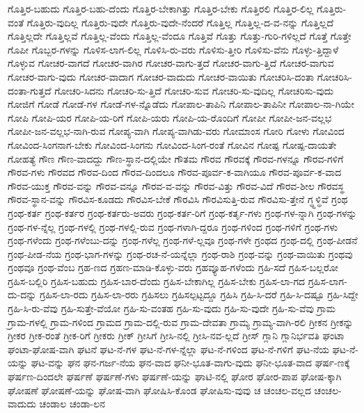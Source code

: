 {ಗೊತ್ತಿರ-ಬಹುದು
ಗೊತ್ತಿರ-ಬಹು-ದೆಂದು
ಗೊತ್ತಿರ-ಬೇಕಾಗಿತ್ತು
ಗೊತ್ತಿರ-ಬೇಕು
ಗೊತ್ತಿರಲಿ
ಗೊತ್ತಿರ-ಲಿಲ್ಲ
ಗೊತ್ತಿರು-ವಂತೆ
ಗೊತ್ತಿರು-ವುದಿಲ್ಲ
ಗೊತ್ತಿರು-ವುದೇ
ಗೊತ್ತಿರು-ವುದೇ-ನೆಂದರೆ
ಗೊತ್ತಿಲ್ಲ
ಗೊತ್ತಿಲ್ಲ-ದ-ವ-ನನ್ನು
ಗೊತ್ತಿಲ್ಲದೆ
ಗೊತ್ತಿಲ್ಲದೇ
ಗೊತ್ತಿಲ್ಲವೆ
ಗೊತ್ತಿಲ್ಲ-ವೆಂದು
ಗೊತ್ತಿಲ್ಲ-ವೆಂದೂ
ಗೊತ್ತಿವೆ
ಗೊತ್ತು
ಗೊತ್ತು-ಗುರಿ-ಗಳಿಲ್ಲದೆ
ಗೊತ್ತೆ
ಗೊತ್ತೇ
ಗೊಪೀ
ಗೊಬ್ಬರ-ಗಳನ್ನು
ಗೊಳಿಸ-ಲಾಗ-ಲಿಲ್ಲ
ಗೊಳಿಸಿ-ರು-ವರು
ಗೊಳಿಸು-ತ್ತೀರಿ
ಗೊಳಿಸು-ವೆನು
ಗೊಳ್ಳು-ತ್ತಿದ್ದಾಳೆ
ಗೊಳ್ಳುವ
ಗೋಚರ-ವಾಗದೆ
ಗೋಚರ-ವಾಗಿರ
ಗೋಚರ-ವಾಗು-ತ್ತದೆ
ಗೋಚರ-ವಾಗು-ತ್ತಿದೆ
ಗೋಚರ-ವಾಗುವ
ಗೋಚರ-ವಾಗು-ವುದು
ಗೋಚರ-ವಾದಾಗ
ಗೋಚರ-ವಾದುದು
ಗೋಚರ-ವಾಯಿತು
ಗೋಚರಿಸಿ-ದಂತಾ
ಗೋಚರಿಸಿ-ದಂತಾ-ಗುತ್ತದೆ
ಗೋಚರಿ-ಸಿದನು
ಗೋಚರಿ-ಸು-ತ್ತಿದೆ
ಗೋಚರಿ-ಸುವ
ಗೋಚರಿ-ಸು-ವುದಿಲ್ಲ
ಗೋಚರಿಸು-ವುದು
ಗೋಜಿಗೆ
ಗೋಡೆ
ಗೋಡೆ-ಗಳ
ಗೋಡೆ-ಗಳ-ನ್ನೊಡೆದು
ಗೋಪಾಲ-ತಾಪಿನಿ
ಗೋಪಾಲ-ತಾಪಿನೀ
ಗೋಪಾಲ-ನಾ-ಗಿಯೇ
ಗೋಪಿ
ಗೋಪಿ-ಯರ
ಗೋಪಿ-ಯ-ರಿಗೆ
ಗೋಪಿ-ಯರು
ಗೋಪಿ-ಯ-ರೊಂದಿಗೆ
ಗೋಪೀ
ಗೋಪೀ-ಜನ-ವಲ್ಲಭ
ಗೋಪೀ-ಜನ-ವಲ್ಲಭ-ನಾಗಿ-ರುವ
ಗೋಪ್ಯ-ವಾಗಿ
ಗೋಪ್ಯ-ವಾಗಿಡು-ವರು
ಗೋಮಾಂಸ
ಗೋರಿ
ಗೋಳು
ಗೋವಿಂದ
ಗೋವಿಂದ-ಸಿಂಗನಾಗ-ಬೇಕು
ಗೋವಿಂದ-ಸಿಂಗನು
ಗೋವಿಂದ-ಸಿಂಗ-ರಂತೆ
ಗೋವಿನ
ಗೋಷ್ಪ
ಗೋಷ್ಪ-ದಾಯತೇ
ಗೋಹತ್ಯೆ
ಗೌಣ
ಗೌಣ-ವಾದದ್ದು
ಗೌಣ-ಸ್ಥಾನ-ದಲ್ಲಿಯೇ
ಗೌತಮ
ಗೌರವ
ಗೌರವಕ್ಕೆ
ಗೌರವ-ಗಳನ್ನೂ
ಗೌರವ-ಗಳಿಗೆ
ಗೌರವ-ಗಳು
ಗೌರವದ
ಗೌರವ-ದಿಂದ
ಗೌರವ-ದಿಂದಲೂ
ಗೌರವ-ಪೂರ್ವ-ಕ-ವಾಗಿಯೂ
ಗೌರವ-ಪೂರ್ವ-ಕ-ವಾದ
ಗೌರವ-ಯುಕ್ತ
ಗೌರವ-ವನ್ನು
ಗೌರವ-ವನ್ನೂ
ಗೌರವ-ವ-ವನ್ನು
ಗೌರವ-ವಿತ್ತು
ಗೌರವ-ವಿದೆ
ಗೌರವ-ಶೀಲ
ಗೌರವಸ್ಥ
ಗೌರವ-ಸ್ಥಾನ-ವನ್ನು
ಗೌರವಿಸ-ಕೂಡದು
ಗೌರವಿಸ-ಬೇಕೆ
ಗೌರವಿಸಿ
ಗೌರವಿಸುತ್ತಿ-ರುವ
ಗೌರವಿಸು-ತ್ತೇನೆ
ಗ್ಧ್ಧಳ್ಧಿವೆ
ಗ್ರಂಥ
ಗ್ರಂಥ-ಕರ್ತ
ಗ್ರಂಥ-ಕರ್ತರ
ಗ್ರಂಥ-ಕರ್ತರು-ಅವರು
ಗ್ರಂಥ-ಕರ್ತ-ರಿಗೆ
ಗ್ರಂಥ-ಕರ್ತೃ-ಗಳು
ಗ್ರಂಥ-ಗಳ-ನ್ನಾಗಿ
ಗ್ರಂಥ-ಗಳನ್ನು
ಗ್ರಂಥ-ಗಳ-ನ್ನೆಲ್ಲ
ಗ್ರಂಥ-ಗಳಲ್ಲಿ
ಗ್ರಂಥ-ಗಳಲ್ಲಿ-ರುವ
ಗ್ರಂಥ-ಗಳಾಗಿ-ದ್ದರೂ
ಗ್ರಂಥ-ಗಳಿಂದ
ಗ್ರಂಥ-ಗಳಿಗೆ
ಗ್ರಂಥ-ಗಳು
ಗ್ರಂಥ-ಗಳೆಂದು
ಗ್ರಂಥ-ಗಳೆಂಬು-ದನ್ನು
ಗ್ರಂಥ-ಗಳೆಲ್ಲ
ಗ್ರಂಥ-ಗಳೆ-ಲ್ಲವೂ
ಗ್ರಂಥ-ಗಳೇ
ಗ್ರಂಥದ
ಗ್ರಂಥ-ದಲ್ಲಿ
ಗ್ರಂಥ-ಪೀಡನೆ
ಗ್ರಂಥ-ಪೀಡ-ನೆಯ
ಗ್ರಂಥ-ಭಾಗ-ಗಳನ್ನು
ಗ್ರಂಥ-ರಚ-ನೆ-ಯನ್ನೆಲ್ಲಾ
ಗ್ರಂಥ-ರಾಶಿ
ಗ್ರಂಥ-ವನ್ನು
ಗ್ರಂಥ-ವಾಯಿತು
ಗ್ರಂಥವು
ಗ್ರಂಥವೂ
ಗ್ರಂಥ-ವೆಂಬ
ಗ್ರಹ-ಣದ
ಗ್ರಹಣ-ಮಾಡಿ-ಕೊಳ್ಳು-ವರು
ಗ್ರಹವ್ಯೂಹ-ಗಳೆಂದು
ಗ್ರಹಿ-ಸದೆ
ಗ್ರಹಿಸ-ಬಲ್ಲರೋ
ಗ್ರಹಿಸ-ಬಲ್ಲಿರಿ
ಗ್ರಹಿಸ-ಬಹುದು
ಗ್ರಹಿಸ-ಬಾರ-ದೆಂದು
ಗ್ರಹಿಸ-ಬೇಕಾಗಿಲ್ಲ
ಗ್ರಹಿಸ-ಬೇಕು
ಗ್ರಹಿಸ-ಲಾ-ಗದ
ಗ್ರಹಿಸ-ಲಾಗ-ದು-ದನ್ನು
ಗ್ರಹಿಸ-ಲಾ-ರದು
ಗ್ರಹಿಸ-ಲಾ-ರರು
ಗ್ರಹಿಸಲು
ಗ್ರಹಿಸಲ್ಪಟ್ಟದ್ದೂ
ಗ್ರಹಿಸಿ
ಗ್ರಹಿ-ಸಿ-ದರೆ
ಗ್ರಹಿ-ಸಿ-ದಷ್ಟೂ
ಗ್ರಹಿ-ಸಿದ್ದೇ
ಗ್ರಹಿ-ಸಿ-ರು-ವೆವು
ಗ್ರಹಿ-ಸುತ್ತೇ-ವೆಯೋ
ಗ್ರಹಿ-ಸು-ವಂತಹ
ಗ್ರಹಿ-ಸು-ವುದು
ಗ್ರಹಿ-ಸು-ವುದೇ
ಗ್ರಹಿ-ಸು-ವೆವು
ಗ್ರಾಮ
ಗ್ರಾಮ-ಗಳಲ್ಲಿ
ಗ್ರಾಮ-ಗಳಿಂದ
ಗ್ರಾಮದ
ಗ್ರಾಮ-ದಲ್ಲಿ-ರುವ
ಗ್ರಾಮ-ದೇವತಾ
ಗ್ರಾಮ್ಯ
ಗ್ರಾಮ್ಯ-ವಾಗಿ-ರಲಿ
ಗ್ರೀಕನ
ಗ್ರೀಕನ್ನು
ಗ್ರೀಕರ
ಗ್ರೀಕ-ರಂತೆ
ಗ್ರೀಕ-ರಿಗೆ
ಗ್ರೀಕರು
ಗ್ರೀಕ್
ಗ್ರೀಸಿಗೆ
ಗ್ರೀಸಿ-ನಲ್ಲಿ
ಗ್ರೀಸಿ-ನವ-ಲ್ಲದೆ
ಗ್ರೀಸ್
ಗ್ಲಾನಿ
ಗ್ಲಾನಿರ್ಭವತಿ
ಘಂಟಾ
ಘಂಟಾ-ಘೋಷ-ವಾಗಿ
ಘಟನೆ
ಘಟ-ನೆ-ಗಳ
ಘಟ-ನೆ-ಗಳ-ನ್ನೆಲ್ಲಾ
ಘಟ-ನೆ-ಗಳಿಂದ
ಘಟ-ನೆ-ಗಳಿಗೆ
ಘಟ-ನೆಯ
ಘಟ-ನೆ-ಯನ್ನು
ಘಟ-ವನ್ನು
ಘನ
ಘನ-ಗರ್ಜ-ನೆಯ
ಘನ-ವಾದ
ಘನೀ-ಭೂತ-ವಾಗು-ವುದು
ಘನೀ-ಭೂತ-ವಾದ
ಘರ್ಷ-ಣಕ್ಕೆ
ಘರ್ಷಣ-ದಿಂದಲೇ
ಘರ್ಷಣೆ
ಘರ್ಷಣೆ-ಗಳು
ಘರ್ಷಣೆ-ಯನ್ನು
ಘಾಟಿ-ನಲ್ಲಿ
ಘೋರ
ಘೋರ-ಪಾಪ
ಘೋಷ-ಕ್ಕಾಗಿ
ಘೋಷಣೆ
ಘೋಷಣೆ-ಯನ್ನು
ಘೋಷ-ವಾಗಿ
ಘೋಷಿಸಿ-ಕೊಂಡ
ಘೋಷಿಸು-ವುವು
ಚ
ಚಂಚಲ-ವಲ್ಲದ
ಚಂಚಲ-ವಾದುದು
ಚಂಡಾಲ
ಚಂಡಾ-ಲನ
}
